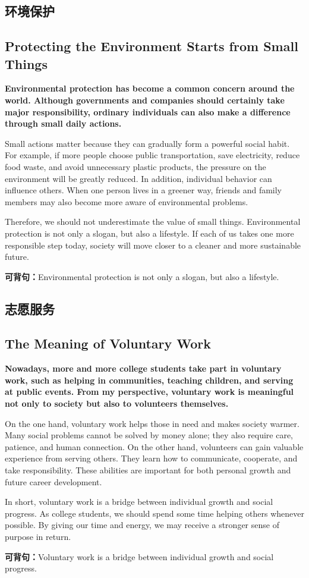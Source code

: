 ﻿\documentclass[UTF8,zihao=-4]{ctexart}
\newenvironment{essayblock}{\Needspace{0.46\textheight}\begin{samepage}}{\end{samepage}\vspace{0.2em}}
\newcommand{\essay}[3]{\section{#1}\subsection{#2}\textbf{#3}\par}
\newcommand{\keysentence}[1]{\begin{sentbox}\textbf{可背句：}#1\end{sentbox}}
\begin{document}
\begin{essayblock}
\essay{环境保护}{Protecting the Environment Starts from Small Things}{Environmental protection has become a common concern around the world. Although governments and companies should certainly take major responsibility, ordinary individuals can also make a difference through small daily actions.}

Small actions matter because they can gradually form a powerful social habit. For example, if more people choose public transportation, save electricity, reduce food waste, and avoid unnecessary plastic products, the pressure on the environment will be greatly reduced. In addition, individual behavior can influence others. When one person lives in a greener way, friends and family members may also become more aware of environmental problems.

Therefore, we should not underestimate the value of small things. Environmental protection is not only a slogan, but also a lifestyle. If each of us takes one more responsible step today, society will move closer to a cleaner and more sustainable future.

\keysentence{Environmental protection is not only a slogan, but also a lifestyle.}
\end{essayblock}

\begin{essayblock}
\essay{志愿服务}{The Meaning of Voluntary Work}{Nowadays, more and more college students take part in voluntary work, such as helping in communities, teaching children, and serving at public events. From my perspective, voluntary work is meaningful not only to society but also to volunteers themselves.}

On the one hand, voluntary work helps those in need and makes society warmer. Many social problems cannot be solved by money alone; they also require care, patience, and human connection. On the other hand, volunteers can gain valuable experience from serving others. They learn how to communicate, cooperate, and take responsibility. These abilities are important for both personal growth and future career development.

In short, voluntary work is a bridge between individual growth and social progress. As college students, we should spend some time helping others whenever possible. By giving our time and energy, we may receive a stronger sense of purpose in return.

\keysentence{Voluntary work is a bridge between individual growth and social progress.}
\end{essayblock}
\end{document}
